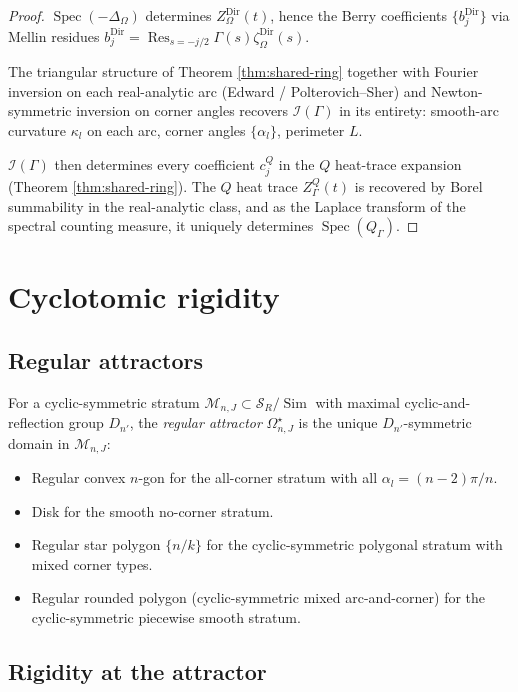 \documentclass[11pt,reqno]{amsart}
\theoremstyle{plain}
\theoremstyle{definition}
\theoremstyle{remark}
\DeclareMathOperator{\Spec}{Spec}
\DeclareMathOperator{\Sim}{Sim}
\DeclareMathOperator{\Res}{Res}
\newcommand{\Scal}{\mathcal{S}}
\newcommand{\Mcal}{\mathcal{M}}
\newcommand{\Qop}{Q}
\newcommand{\Icalbb}{\mathcal{I}}
\begin{document}
\begin{proof}
$\Spec(-\Delta_\Omega)$ determines $Z_\Omega^{\mathrm{Dir}}(t)$, hence the Berry coefficients $\{b_j^{\mathrm{Dir}}\}$ via Mellin residues $b_j^{\mathrm{Dir}} = \Res_{s=-j/2}\Gamma(s)\zeta_\Omega^{\mathrm{Dir}}(s)$.

The triangular structure of Theorem \ref{thm:shared-ring} together with Fourier inversion on each real-analytic arc (Edward / Polterovich--Sher) and Newton-symmetric inversion on corner angles recovers $\Icalbb(\Gamma)$ in its entirety: smooth-arc curvature $\kappa_l$ on each arc, corner angles $\{\alpha_l\}$, perimeter $L$.

$\Icalbb(\Gamma)$ then determines every coefficient $c_j^{\Qop}$ in the $\Qop$ heat-trace expansion (Theorem \ref{thm:shared-ring}). The $\Qop$ heat trace $Z_\Gamma^{\Qop}(t)$ is recovered by Borel summability in the real-analytic class, and as the Laplace transform of the spectral counting measure, it uniquely determines $\Spec(\Qop_\Gamma)$.
\end{proof}

\section{Cyclotomic rigidity}\label{sec:cyclotomic}

\subsection{Regular attractors}\label{ss:regular-attractors-master}

For a cyclic-symmetric stratum $\Mcal_{n,J} \subset \Scal_R/\Sim$ with maximal cyclic-and-reflection group $D_{n'}$, the \emph{regular attractor} $\Omega^\star_{n,J}$ is the unique $D_{n'}$-symmetric domain in $\Mcal_{n,J}$:
\begin{itemize}
\item Regular convex $n$-gon for the all-corner stratum with all $\alpha_l = (n-2)\pi/n$.
\item Disk for the smooth no-corner stratum.
\item Regular star polygon $\{n/k\}$ for the cyclic-symmetric polygonal stratum with mixed corner types.
\item Regular rounded polygon (cyclic-symmetric mixed arc-and-corner) for the cyclic-symmetric piecewise smooth stratum.
\end{itemize}

\subsection{Rigidity at the attractor}\label{ss:rigidity-thm-master}
\end{document}
